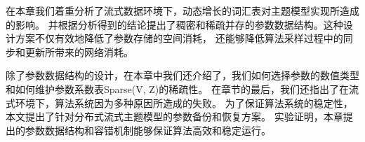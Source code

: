 在本章我们着重分析了流式数据环境下，动态增长的词汇表对主题模型实现所造成的影响。
并根据分析得到的结论提出了稠密和稀疏并存的参数数据结构。这种设计方案不仅有效地降低了参数存储的空间消耗，
还能够降低算法采样过程中的同步和更新所带来的网络消耗。

除了参数数据结构的设计，在本章中我们还介绍了，我们如何选择参数的数值类型和如何维护参数系数表Sparse(V, Z)的稀疏性。
在章节的最后，我们还指出了在流式环境下，算法系统因为多种原因所造成的失败。
为了保证算法系统的稳定性，本文提出了针对分布式流式主题模型的参数备份和恢复方案。
实验证明，本章提出的参数数据结构和容错机制能够保证算法高效和稳定运行。
